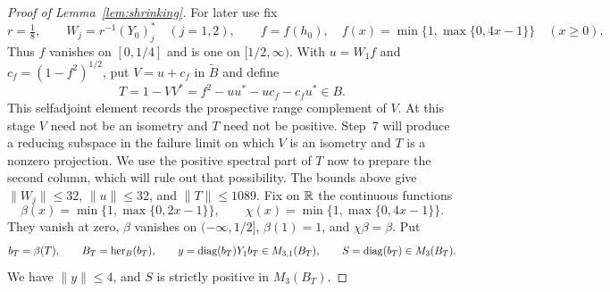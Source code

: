 \begin{proof}[Proof of Lemma~\ref{lem:shrinking}]
For later use fix
\[
 r=\tfrac18,\qquad
 W_j=r^{-1}(Y_0)_j^*\quad(j=1,2),\qquad
 f=f(h_0),\quad f(x)=\min\{1,\max\{0,4x-1\}\}\quad(x\ge0).
\]
Thus $f$ vanishes on $[0,1/4]$ and is one on $[1/2,\infty)$.
With $u=W_1f$ and $c_f=(1-f^2)^{1/2}$, put $V=u+c_f$ in
$\widetilde B$ and define
\begin{equation}\label{shr:T}
 T=1-VV^*=f^2-uu^*-u c_f-c_f u^*\in B.
\end{equation}
This selfadjoint element records the prospective range complement of
$V$.  At this stage $V$ need not be an isometry and $T$ need not be
positive.  Step~7 will produce a reducing subspace in the failure limit
on which $V$ is an isometry and $T$ is a nonzero projection.  We use
the positive spectral part of $T$ now to prepare the second column,
which will rule out that possibility.
The bounds above give
$\|W_j\|\le32$, $\|u\|\le32$, and $\|T\|\le1089$.  Fix on $\mathbb R$ the
continuous functions
\[
 \beta(x)=\min\{1,\max\{0,2x-1\}\},\qquad
 \chi(x)=\min\{1,\max\{0,4x-1\}\}.
\]
They vanish at zero, $\beta$ vanishes on $(-\infty,1/2]$,
$\beta(1)=1$, and $\chi\beta=\beta$.  Put
\begin{equation}\label{shr:BT-y}
 b_T=\beta(T),\qquad B_T=\operatorname{her}_B(b_T),\qquad
 y=\operatorname{diag}(b_T)Y_1b_T\in M_{3,1}(B_T),\qquad
 S=\operatorname{diag}(b_T)\in M_3(B_T).
\end{equation}
We have $\|y\|\le4$, and $S$ is strictly positive in $M_3(B_T)$.


\end{proof}
